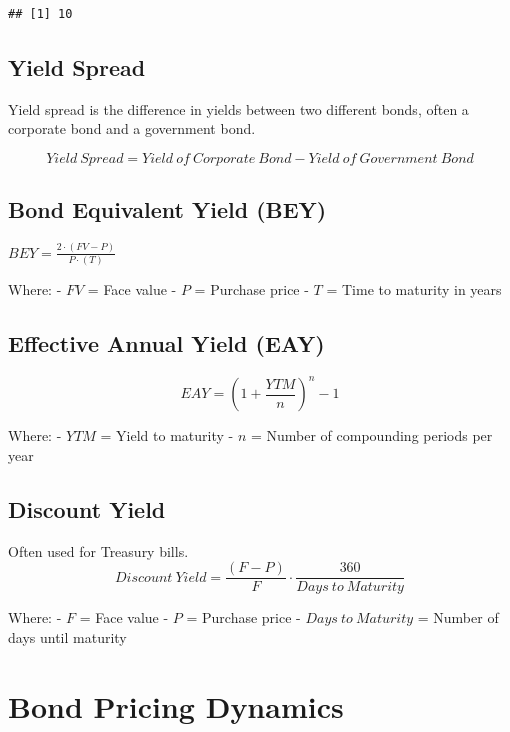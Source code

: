 \documentclass[
]{book}
\begin{document}
\begin{verbatim}
## [1] 10
\end{verbatim}

\hypertarget{yield-spread}{%
\subsection{Yield Spread}\label{yield-spread}}

Yield spread is the difference in yields between two different bonds, often a corporate bond and a government bond.

\[
Yield\ Spread = Yield\ of\ Corporate\ Bond - Yield\ of\ Government\ Bond
\]

\hypertarget{bond-equivalent-yield-bey}{%
\subsection{Bond Equivalent Yield (BEY)}\label{bond-equivalent-yield-bey}}

\(BEY = \frac{2 \cdot (FV - P)}{P \cdot (T)}\)

Where:
- \(FV\) = Face value
- \(P\) = Purchase price
- \(T\) = Time to maturity in years

\hypertarget{effective-annual-yield-eay}{%
\subsection{Effective Annual Yield (EAY)}\label{effective-annual-yield-eay}}

\[EAY = \left(1 + \frac{YTM}{n}\right)^n - 1\]

Where:
- \(YTM\) = Yield to maturity
- \(n\) = Number of compounding periods per year

\hypertarget{discount-yield}{%
\subsection{Discount Yield}\label{discount-yield}}

Often used for Treasury bills.
\[Discount\ Yield = \frac{(F - P)}{F} \cdot \frac{360}{Days\ to\ Maturity}\]

Where:
- \(F\) = Face value
- \(P\) = Purchase price
- \(Days\ to\ Maturity\) = Number of days until maturity

\hypertarget{bond-pricing-dynamics}{%
\section{Bond Pricing Dynamics}\label{bond-pricing-dynamics}}
\end{document}
